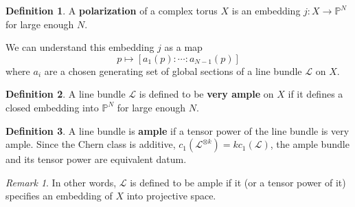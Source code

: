 \documentclass[12pt,reqno]{amsart}
\newcommand{\mc}{\mathcal}
\renewcommand{\P}{\mathbb{P}}
\theoremstyle{definition}
\newtheorem{defn}{Definition}
\theoremstyle{remark}
\newtheorem*{remark}{Remark}
\begin{document}
\begin{defn} A \textbf{polarization} of a complex torus $X$ is an embedding $j: X \to \P^N$ for large enough $N$. \end{defn}



We can understand this embedding $j$ as a map $$p \mapsto [a_1(p) : \cdots : a_{N-1}(p)]$$ where $a_i$ are a chosen generating set of global sections of a line bundle $\mc{L}$ on $X$. 


\begin{defn} A line bundle $\mc{L}$ is defined to be \textbf{very ample} on $X$ if it defines a closed embedding into $\P^N$ for large enough $N$. %
\end{defn}

\begin{defn} A line bundle is \textbf{ample} if a tensor power of the line bundle is very ample. Since the Chern class is additive, $c_1(\mc{L}^{\otimes k}) = kc_1(\mc{L})$, the ample bundle and its tensor power are equivalent datum. \end{defn} 

\begin{remark} In other words, $\mc{L}$ is defined to be ample if it (or a tensor power of it) specifies an embedding of $X$ into projective space.\end{remark}


\end{document}
